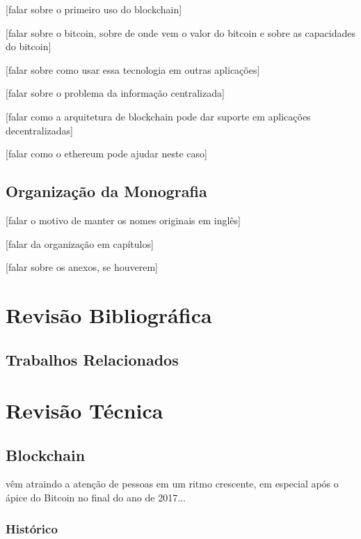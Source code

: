 \documentclass[tcc,capa]{texufpel}
\begin{document}
	[falar sobre o primeiro uso do blockchain]
	
	[falar sobre o bitcoin, sobre de onde vem o valor do bitcoin e sobre as capacidades do bitcoin]
	
	[falar sobre como usar essa tecnologia em outras aplicações]
	
	[falar sobre o problema da informação centralizada]
	
	[falar como a arquitetura de blockchain pode dar suporte em aplicações decentralizadas]
	
	[falar como o ethereum pode ajudar neste caso]

\section{Organização da Monografia}

    [falar o motivo de manter os nomes originais em inglês]
    
    [falar da organização em capítulos]
    
    [falar sobre os anexos, se houverem]



\chapter{Revisão Bibliográfica}

\section{Trabalhos Relacionados}


\chapter{Revisão Técnica}

\section{Blockchain}

    \Bchain vêm atraindo a atenção de pessoas em um ritmo crescente, em especial após o ápice do Bitcoin no final do ano de 2017...
    
    
    \subsection{Histórico}
	
\end{document}
